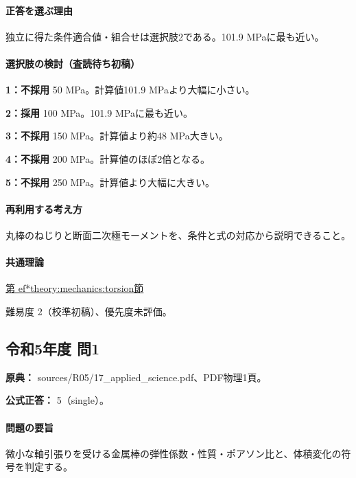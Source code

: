 \paragraph{正答を選ぶ理由} 独立に得た条件適合値・組合せは選択肢2である。101.9 MPaに最も近い。

\paragraph{選択肢の検討（査読待ち初稿）}

\noindent\textbf{1：不採用} 50 MPa。計算値101.9 MPaより大幅に小さい。\par

\noindent\textbf{2：採用} 100 MPa。101.9 MPaに最も近い。\par

\noindent\textbf{3：不採用} 150 MPa。計算値より約48 MPa大きい。\par

\noindent\textbf{4：不採用} 200 MPa。計算値のほぼ2倍となる。\par

\noindent\textbf{5：不採用} 250 MPa。計算値より大幅に大きい。\par

\paragraph{再利用する考え方} 丸棒のねじりと断面二次極モーメントを、条件と式の対応から説明できること。

\paragraph{共通理論} \hyperref[theory:mechanics:torsion]{第
ef*{theory:mechanics:torsion}節}

\par 難易度 2（校準初稿）、優先度未評価。

\subsection{令和5年度 問1}
\label{q:r05-reg-applied-01}

\noindent\textbf{原典：} sources/R05/17\_applied\_science.pdf、PDF物理1頁。

\textbf{公式正答：} 5（single）。

\paragraph{問題の要旨} 微小な軸引張りを受ける金属棒の弾性係数・性質・ポアソン比と、体積変化の符号を判定する。

